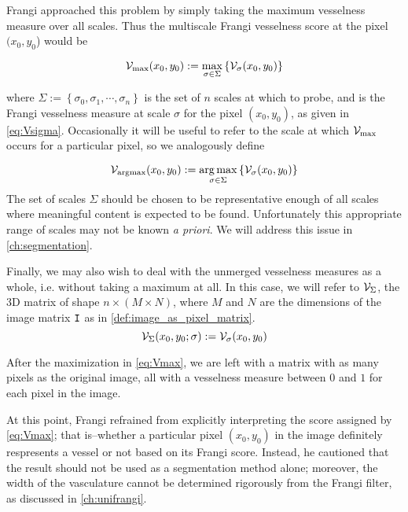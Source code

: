     Frangi \cite{frangi-paper} approached this problem by simply taking the maximum vesselness measure over all scales. Thus the multiscale Frangi vesselness score at the pixel $(x_0, y_0$) would be 
    
    \begin{equation} \label{eq:Vmax}
    \mathcal{V}_{\max}(x_0, y_0) :=
    	\underset{\sigma \in \Sigma}{\max}\left\{  \mathcal{V}_{\sigma} (x_0, y_0) \right\}
    \end{equation}
    
    where $\Sigma := \left\{ \sigma_0, \sigma_1 , \cdots, \sigma_n \right\}$ is
    the set of $n$ scales at which to probe, and \Vsigma is the Frangi vesselness measure at scale $\sigma$ for the pixel $(x_0,y_0)$, as given in \cref{eq:Vsigma}.
    Occasionally it will be useful to refer to the scale at which $\mathcal{V}_{\max}$ occurs for a 
    particular pixel, so we analogously define
    
    \begin{equation} \label{eq:Vargmax}
    \mathcal{V}_{\mathrm{argmax}}(x_0, y_0) := \underset{\sigma \in \Sigma}{\arg\max}\left\{  \mathcal{V}_{\sigma} (x_0, y_0) \right\}
    \end{equation}
The set of scales $\Sigma$ should be chosen to be representative enough of all scales where meaningful content is expected to be found. Unfortunately this appropriate range of scales may not be known \textit{a priori}. We will address this issue in \cref{ch:segmentation}.

Finally, we may also wish to deal with the unmerged vesselness measures as a whole, i.e. without taking a maximum at all. In this case, we will refer to $\mathcal{V}_{\Sigma}$, the 3D matrix of shape
$n \times (M\times N)$, where $M$ and $N$ are the dimensions of the image matrix $\mathtt{I}$
as in \cref{def:image_as_pixel_matrix}.
	\begin{equation} \label{eq:VSigma}
	\mathcal{V}_{\Sigma}(x_0,y_0 ; \sigma) := \mathcal{V}_{\sigma}(x_0,y_0)
\end{equation}

    
    After the maximization in \cref{eq:Vmax}, we are left with a matrix with as many pixels as the original image, all with a vesselness measure between $0$ and $1$ for each pixel in the image.
         
    At this point, Frangi \cite{frangi-paper} refrained from explicitly interpreting the score assigned by \cref{eq:Vmax}; that is--whether a particular pixel $(x_0,y_0)$ in the image definitely respresents a vessel or not based on its Frangi score. Instead, he cautioned that the result should not be used as a segmentation method alone; moreover, the width of the vasculature cannot be determined rigorously from the Frangi filter, as discussed in \cref{ch:unifrangi}. 
   
